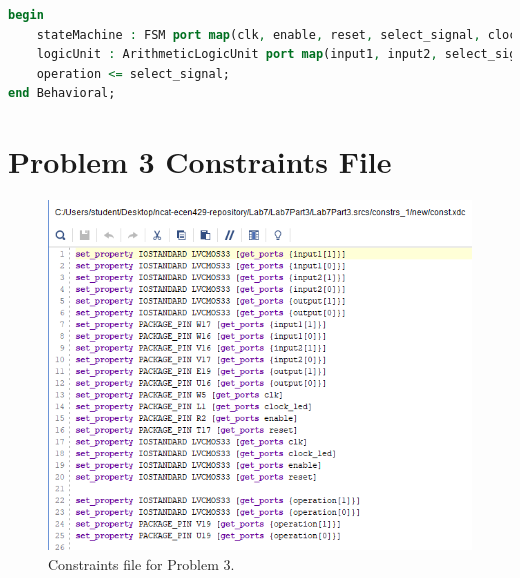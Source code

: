 \documentclass[11pt]{article}
\begin{document}
\begin{appendices}
\begin{lstlisting}[language=VHDL]
begin
    stateMachine : FSM port map(clk, enable, reset, select_signal, clock_led);
    logicUnit : ArithmeticLogicUnit port map(input1, input2, select_signal, output);
    operation <= select_signal;
end Behavioral;
\end{lstlisting}

\section{Problem 3 Constraints File}
\begin{center}
\begin{figure}[H]
	\includegraphics[scale=1]{./images/Lab7Part3Const.png}
	\caption{\label{fig:Prob1Const}Constraints file for Problem 3.}
\end{figure}
\end{center}

\end{appendices}
\end{document}
